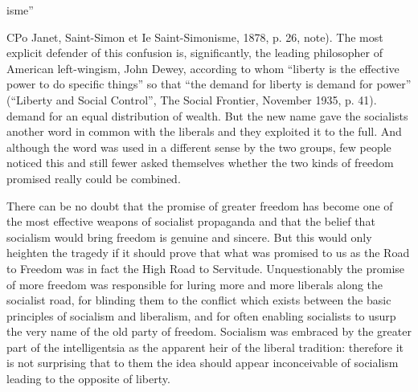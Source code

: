 \documentclass[11pt,openany]{book}
\begin{document}
isme''

CPo Janet, Saint-Simon et Ie Saint-Simonisme, 1878, p. 26, note). The most explicit defender of this confusion is, significantly, the leading philosopher of American left-wingism, John Dewey, according to whom ``liberty is the effective power to do specific things'' so that ``the demand for liberty is demand for power'' (``Liberty and Social Control'', The Social Frontier, November 1935, p. 41). demand for an equal distribution of wealth. But the new name gave the socialists another word in common with the liberals and they exploited it to the full. And although the word was used in a different sense by the two groups, few people noticed this and still fewer asked themselves whether the two kinds of freedom promised really could be combined.

There can be no doubt that the promise of greater freedom has become one of the most effective weapons of socialist propaganda and that the belief that socialism would bring freedom is genuine and sincere. But this would only heighten the tragedy if it should prove that what was promised to us as the Road to Freedom was in fact the High Road to Servitude. Unquestionably the promise of more freedom was responsible for luring more and more liberals along the socialist road, for blinding them to the conflict which exists between the basic principles of socialism and liberalism, and for often enabling socialists to usurp the very name of the old party of freedom. Socialism was embraced by the greater part of the intelligentsia as the apparent heir of the liberal tradition: therefore it is not surprising that to them the idea should appear inconceivable of socialism leading to the opposite of liberty.

\begin{center}\textasteriskcentered\hspace{0.9em}\textasteriskcentered\hspace{0.9em}\textasteriskcentered\end{center}

\begin{center}\textasteriskcentered\hspace{0.9em}\textasteriskcentered\hspace{0.9em}\textasteriskcentered\end{center}

\begin{center}\textasteriskcentered\hspace{0.9em}\textasteriskcentered\hspace{0.9em}\textasteriskcentered\end{center}
\end{document}
